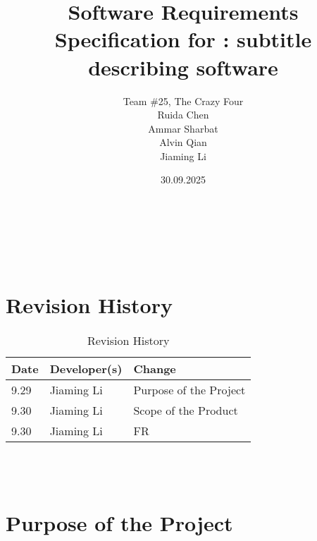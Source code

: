 \documentclass[12pt]{article}
\begin{document}
\title{Software Requirements Specification for \progname: subtitle describing software}
\author{
    Team \#25, The Crazy Four \\[1ex]
    Ruida Chen \\
    Ammar Sharbat \\
    Alvin Qian \\
    Jiaming Li
}
\date{30.09.2025}
    
\maketitle

~\newpage


\tableofcontents

~\newpage

\section*{Revision History}

\begin{table}[hp]
    \caption{Revision History} \label{TblRevisionHistory}
    \begin{tabularx}{\textwidth}{llX}
        \toprule
        \textbf{Date} & \textbf{Developer(s)} & \textbf{Change}\\
        \midrule
        9.29 & Jiaming Li & Purpose of the Project\\
        9.30 & Jiaming Li & Scope of the Product\\
        9.30 & Jiaming Li & FR\\
        \bottomrule
    \end{tabularx}
\end{table}

~\\

~\newpage
\section{Purpose of the Project}
\end{document}
